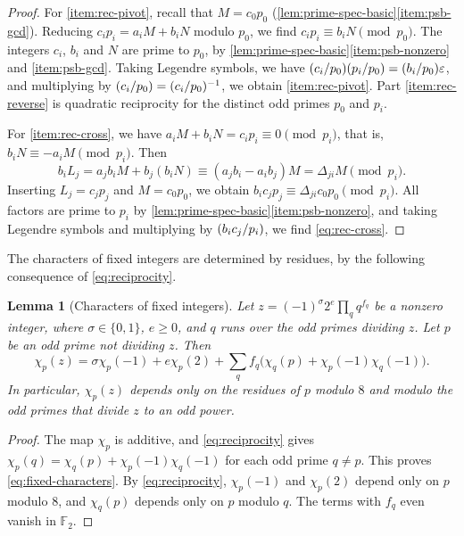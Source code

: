 \documentclass[12pt,oneside,openany]{book}
\theoremstyle{definition}
\theoremstyle{plain}
\numberwithin{equation}{chapter}
\theoremstyle{plain}
\newtheorem{lemma}[lemma]{Lemma}
\theoremstyle{definition}
\theoremstyle{remark}
\newcommand{\F}{\mathbb F}
\newcommand{\leg}[2]{\mathchoice{\left(\frac{#1}{#2}\right)}{(#1/#2)}{(#1/#2)}{(#1/#2)}}
\newcommand{\eps}{\varepsilon}
\begin{document}
\begin{proof}
For \ref{item:rec-pivot}, recall that $M=c_0p_0$ (\cref{lem:prime-spec-basic}\ref{item:psb-gcd}). Reducing $c_ip_i=a_iM+b_iN$ modulo $p_0$, we find $c_ip_i\equiv b_iN\pmod{p_0}$. The integers $c_i$, $b_i$ and $N$ are prime to $p_0$, by \cref{lem:prime-spec-basic}\ref{item:psb-nonzero} and \ref{item:psb-gcd}. Taking Legendre symbols, we have $\leg{c_i}{p_0}\leg{p_i}{p_0}=\leg{b_i}{p_0}\eps$, and multiplying by $\leg{c_i}{p_0}=\leg{c_i}{p_0}^{-1}$, we obtain \ref{item:rec-pivot}. Part \ref{item:rec-reverse} is quadratic reciprocity for the distinct odd primes $p_0$ and $p_i$.

For \ref{item:rec-cross}, we have $a_iM+b_iN=c_ip_i\equiv0\pmod{p_i}$, that is, $b_iN\equiv-a_iM\pmod{p_i}$. Then
\begin{equation}
b_iL_j=a_jb_iM+b_j(b_iN)\equiv(a_jb_i-a_ib_j)M=\Delta_{ji}M\pmod{p_i}.
\end{equation}
Inserting $L_j=c_jp_j$ and $M=c_0p_0$, we obtain $b_ic_jp_j\equiv\Delta_{ji}c_0p_0\pmod{p_i}$. All factors are prime to $p_i$ by \cref{lem:prime-spec-basic}\ref{item:psb-nonzero}, and taking Legendre symbols and multiplying by $\leg{b_ic_j}{p_i}$, we find \eqref{eq:rec-cross}.
\end{proof}

The characters of fixed integers are determined by residues, by the following consequence of \eqref{eq:reciprocity}.

\begin{lemma}[Characters of fixed integers]\label{lem:fixed-characters}
Let $z=(-1)^\sigma2^e\prod_qq^{f_q}$ be a nonzero integer, where $\sigma\in\{0,1\}$, $e\ge0$, and $q$ runs over the odd primes dividing $z$. Let $p$ be an odd prime not dividing $z$. Then
\begin{equation}\label{eq:fixed-characters}
\chi_p(z)=\sigma\chi_p(-1)+e\chi_p(2)+\sum_qf_q\bigl(\chi_q(p)+\chi_p(-1)\chi_q(-1)\bigr).
\end{equation}
In particular, $\chi_p(z)$ depends only on the residues of $p$ modulo $8$ and modulo the odd primes that divide $z$ to an odd power.
\end{lemma}

\begin{proof}
The map $\chi_p$ is additive, and \eqref{eq:reciprocity} gives $\chi_p(q)=\chi_q(p)+\chi_p(-1)\chi_q(-1)$ for each odd prime $q\ne p$. This proves \eqref{eq:fixed-characters}. By \eqref{eq:reciprocity}, $\chi_p(-1)$ and $\chi_p(2)$ depend only on $p$ modulo $8$, and $\chi_q(p)$ depends only on $p$ modulo $q$. The terms with $f_q$ even vanish in $\F_2$.
\end{proof}
\end{document}
